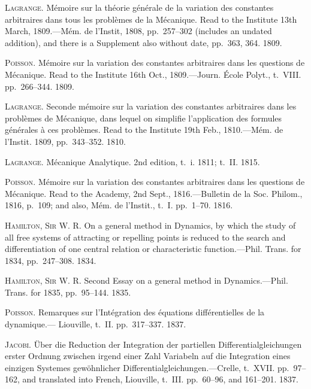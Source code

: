 \documentclass[11pt,a4paper]{book}
\begin{document}
\smallskip

\noindent\textsc{Lagrange}. M\'emoire sur la th\'eorie g\'en\'erale de la variation des constantes arbitraires
dans tous les probl\`emes de la M\'ecanique. Read to the Institute 13th March,
1809.---M\'em. de l'Instit, 1808, pp.~257--302 (includes an undated addition), and
there is a Supplement also without date, pp.~363, 364. 1809.

\smallskip

\noindent\textsc{Poisson}. M\'emoire sur la variation des constantes arbitraires dans les questions de
M\'ecanique. Read to the Institute 16th Oct., 1809.---Journ. \'Ecole Polyt., t.~VIII.
pp.~266--344. 1809.

\smallskip

\noindent\textsc{Lagrange}. Seconde m\'emoire sur la variation des constantes arbitraires dans les
probl\`emes de M\'ecanique, dans lequel on simplifie l'application des formules g\'en\'erales
\`a ces probl\`emes. Read to the Institute 19th Feb., 1810.---M\'em. de l'Instit. 1809,
pp.~343--352. 1810.

\smallskip

\noindent\textsc{Lagrange}. M\'ecanique Analytique. 2nd edition, t.~i. 1811; t.~II. 1815.

\smallskip

\noindent\textsc{Poisson}. M\'emoire sur la variation des constantes arbitraires dans les questions de
M\'ecanique. Read to the Academy, 2nd Sept., 1816.---Bulletin de la Soc. Philom.,
1816, p.~109; and also, M\'em. de l'Instit., t.~I. pp.~1--70. 1816.

\smallskip

\noindent\textsc{Hamilton, Sir W. R.} On a general method in Dynamics, by which the study of all
free systems of attracting or repelling points is reduced to the search and differentiation
of one central relation or characteristic function.---Phil. Trans. for 1834,
pp.~247--308. 1834.

\smallskip

\noindent\textsc{Hamilton, Sir W. R.} Second Essay on a general method in Dynamics.---Phil. Trans.
for 1835, pp.~95--144. 1835.

\smallskip

\noindent\textsc{Poisson}. Remarques sur l'Int\'egration des \'equations diff\'erentielles de la dynamique.---
Liouville, t.~II. pp.~317--337. 1837.

\smallskip

\noindent\textsc{Jacobi}. \"Uber die Reduction der Integration der partiellen Differentialgleichungen
erster Ordnung zwischen irgend einer Zahl Variabeln auf die Integration eines
einzigen Systemes gew\"ohnlicher Differentialgleichungen.---Crelle, t.~XVII. pp.~97--162,
and translated into French, Liouville, t.~III. pp.~60--96, and 161--201. 1837.
\end{document}
